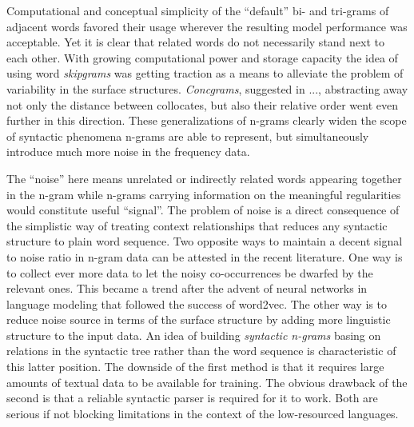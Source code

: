 \documentclass[12pt]{article}
\begin{document}
Computational and conceptual simplicity of the “default” bi- and
tri-grams of adjacent words favored their usage wherever the resulting
model performance was acceptable. Yet it is clear that related words
do not necessarily stand next to each other. With growing
computational power and storage capacity the idea of using word
\textit{skipgrams} was getting traction as a means to alleviate the
problem of variability in the surface structures. \textit{Concgrams}, suggested in ...,
abstracting away not only the distance between collocates, but also
their relative order went even further in this direction. These
generalizations of n-grams clearly widen the scope of syntactic
phenomena n-grams are able to represent, but simultaneously introduce
much more noise in the frequency data.

The “noise” here means unrelated or indirectly related words appearing
together in the n-gram while n-grams carrying information on the
meaningful regularities would constitute useful “signal”. The problem
of noise is a direct consequence of the simplistic way of treating
context relationships that reduces any syntactic structure to plain
word sequence. Two opposite ways to maintain a decent signal to noise
ratio in n-gram data can be attested in the recent literature. One way
is to collect ever more data to let the noisy co-occurrences be
dwarfed by the relevant ones. This became a trend after the advent of
neural networks in language modeling that followed the success of
word2vec. The other way is to reduce noise
source in terms of the surface structure by adding more linguistic
structure to the input data. An idea of building \textit{syntactic
  n-grams} basing on relations in the syntactic tree rather than the
word sequence is characteristic of this latter position. The downside of the first method is that it requires large
amounts of textual data to be available for training. The obvious
drawback of the second is that a reliable syntactic parser is required
for it to work. Both are serious if not blocking limitations in the
context of the low-resourced languages.
\end{document}
